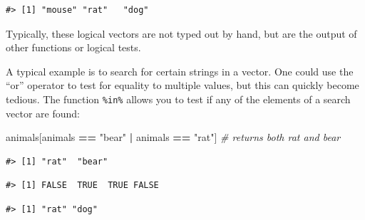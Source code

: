\documentclass[]{book}
\newenvironment{Shaded}{\begin{snugshade}}{\end{snugshade}}
\newcommand{\KeywordTok}[1]{\textcolor[rgb]{0.13,0.29,0.53}{\textbf{#1}}}
\newcommand{\StringTok}[1]{\textcolor[rgb]{0.31,0.60,0.02}{#1}}
\newcommand{\CommentTok}[1]{\textcolor[rgb]{0.56,0.35,0.01}{\textit{#1}}}
\newcommand{\OperatorTok}[1]{\textcolor[rgb]{0.81,0.36,0.00}{\textbf{#1}}}
\newcommand{\NormalTok}[1]{#1}
\begin{document}
\begin{verbatim}
#> [1] "mouse" "rat"   "dog"
\end{verbatim}

Typically, these logical vectors are not typed out by hand, but are the
output of other functions or logical tests.

A typical example is to search for certain strings in a vector. One
could use the ``or'' operator \texttt{\textbar{}} to test for equality
to multiple values, but this can quickly become tedious. The function
\texttt{\%in\%} allows you to test if any of the elements of a search
vector are found:

\begin{Shaded}
\begin{Highlighting}[]
\NormalTok{animals[animals }\OperatorTok{==}\StringTok{ "bear"} \OperatorTok{|}\StringTok{ }\NormalTok{animals }\OperatorTok{==}\StringTok{ "rat"}\NormalTok{] }\CommentTok{# returns both rat and bear}
\end{Highlighting}
\end{Shaded}

\begin{verbatim}
#> [1] "rat"  "bear"
\end{verbatim}

\begin{Shaded}
\end{Shaded}

\begin{verbatim}
#> [1] FALSE  TRUE  TRUE FALSE
\end{verbatim}

\begin{Shaded}
\end{Shaded}

\begin{verbatim}
#> [1] "rat" "dog"
\end{verbatim}
\end{document}
